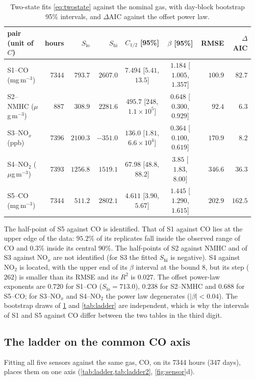 \documentclass[11pt]{article}
\theoremstyle{definition}\newtheorem{definition}[theorem]{Definition}
\theoremstyle{remark}\newtheorem{remark}[theorem]{Remark}
\begin{document}
\begin{table}[htbp]\centering
\caption{Two-state fits \eqref{eq:twostate} against the nominal gas, with day-block bootstrap 95\% intervals, and $\Delta\mathrm{AIC}$ against the offset power law.}\label{tab:nominal}
\footnotesize\setlength{\tabcolsep}{4pt}
\begin{tabular}{@{}lrrrccrr@{}}\toprule
pair (unit of $C$) & hours & $S_\mathrm{lo}$ & $S_\mathrm{hi}$ & $C_{1/2}$ [95\%] & $\beta$ [95\%] & RMSE & $\Delta$AIC\\\midrule
S1--CO (mg\,m$^{-3}$) & 7344 & $793.7$ & $2607.0$ & $7.494$ [$5.41$, $13.5$] & $1.184$ [$1.005$, $1.357$] & $100.9$ & $82.7$\\
S2--NMHC ($\mu$g\,m$^{-3}$) & 887 & $308.9$ & $2281.6$ & $495.7$ [$248$, $1.1\times10^5$] & $0.648$ [$0.300$, $0.929$] & $92.4$ & $6.3$\\
S3--NO$_x$ (ppb) & 7396 & $2100.3$ & $-351.0$ & $136.0$ [$1.81$, $6.6\times10^4$] & $0.364$ [$0.100$, $0.619$] & $170.9$ & $8.2$\\
S4--NO$_2$ ($\mu$g\,m$^{-3}$) & 7393 & $1256.8$ & $1519.1$ & $67.98$ [$48.8$, $88.2$] & $3.85$ [$1.83$, $8.00$] & $346.6$ & $36.3$\\
S5--CO (mg\,m$^{-3}$) & 7344 & $511.2$ & $2802.1$ & $4.611$ [$3.90$, $5.67$] & $1.445$ [$1.290$, $1.615$] & $202.9$ & $162.5$\\\bottomrule
\end{tabular}
\end{table}

The half-point of S5 against CO is identified. That of S1 against CO lies at the upper edge of the data: $95.2\%$ of its replicates fall inside the observed range of CO and $0.3\%$ inside its central $90\%$. The half-points of S2 against NMHC and of S3 against NO$_x$ are not identified (for S3 the fitted $S_\mathrm{hi}$ is negative). S4 against NO$_2$ is located, with the upper end of its $\beta$ interval at the bound $8$, but its step ($262$) is smaller than its RMSE and its $R^2$ is $0.027$. The offset power-law exponents are $0.720$ for S1--CO ($S_\mathrm{lo}=713.0$), $0.238$ for S2--NMHC and $0.688$ for S5--CO; for S3--NO$_x$ and S4--NO$_2$ the power law degenerates ($|\beta|<0.04$). The bootstrap draws of \cref{tab:nominal} and \cref{tab:ladder} are independent, which is why the intervals of S1 and S5 against CO differ between the two tables in the third digit.

\subsection{The ladder on the common CO axis}\label{sec:ladder}
Fitting all five sensors against the same gas, CO, on its 7344 hours (347 days), places them on one axis (\cref{tab:ladder,tab:ladder2}, \cref{fig:sensor}d).
\end{document}
